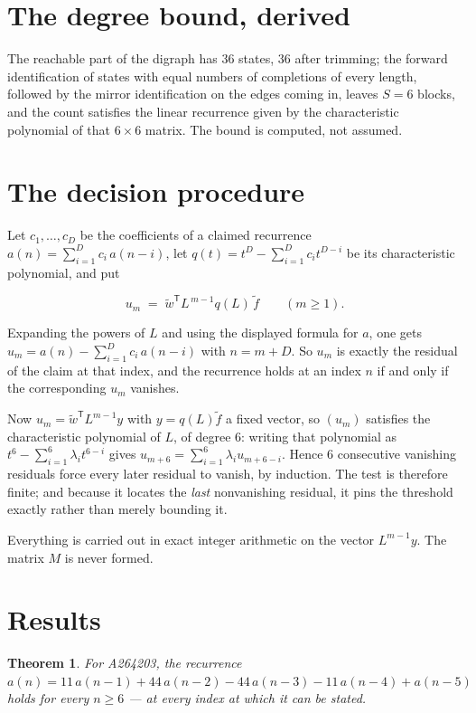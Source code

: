 \documentclass[11pt]{article}
\newtheorem{theorem}{Theorem}
\theoremstyle{definition}
\begin{document}
\section{The degree bound, derived}

The reachable part of the digraph has $36$ states, $36$ after trimming; the forward identification of states with equal numbers of completions of every length, followed by the mirror identification on the edges coming in, leaves $S = 6$ blocks, and the count satisfies the linear recurrence given by the characteristic polynomial of that $6\times6$ matrix. The bound is computed, not assumed.

\section{The decision procedure}

Let $c_1,\dots,c_D$ be the coefficients of a claimed recurrence $a(n) = \sum_{i=1}^{D} c_i\,a(n-i)$, let $q(t) = t^{D} - \sum_{i=1}^{D} c_i t^{D-i}$ be its characteristic polynomial, and put

\[u_m \;=\; \tilde w^{\mathsf T} L^{\,m-1} q(L)\,\tilde f \qquad (m \ge 1).\]

Expanding the powers of $L$ and using the displayed formula for $a$, one gets $u_m = a(n) - \sum_{i=1}^{D} c_i\,a(n-i)$ with $n = m + D$. So $u_m$ is exactly the residual of the claim at that index, and the recurrence holds at an index $n$ if and only if the corresponding $u_m$ vanishes.

Now $u_m = \tilde w^{\mathsf T} L^{m-1} y$ with $y = q(L)\tilde f$ a fixed vector, so $(u_m)$ satisfies the characteristic polynomial of $L$, of degree $6$: writing that polynomial as $t^{6} - \sum_{i=1}^{6} \lambda_i t^{6-i}$ gives $u_{m+6} = \sum_{i=1}^{6} \lambda_i u_{m+6-i}$. Hence $6$ consecutive vanishing residuals force every later residual to vanish, by induction. The test is therefore finite; and because it locates the {\itshape last} nonvanishing residual, it pins the threshold exactly rather than merely bounding it.

Everything is carried out in exact integer arithmetic on the vector $L^{m-1}y$. The matrix $M$ is never formed.

\section{Results}

\begin{theorem} For A264203, the recurrence $a(n) = 11\,a(n-1) + 44\,a(n-2) - 44\,a(n-3) - 11\,a(n-4) + a(n-5)$ holds for every $n \ge 6$ --- at every index at which it can be stated.\end{theorem}
\end{document}
